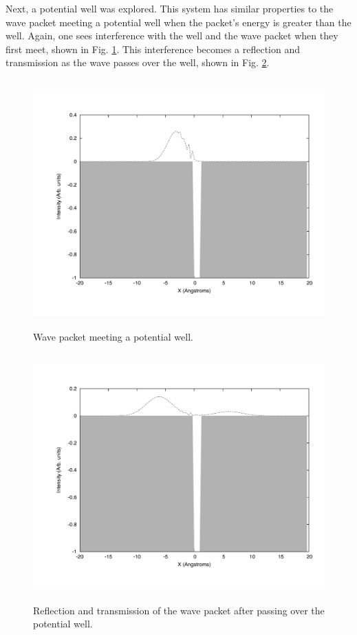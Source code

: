 \documentclass[12pt]{article}
\begin{document}
Next, a potential well was explored.  This system has similar properties to the wave packet meeting a potential well when the packet's energy is greater than the well.  Again, one sees interference with the well and the wave packet when they first meet, shown in Fig. \ref{fig:726c}.  This interference becomes a reflection and transmission as the wave passes over the well, shown in Fig. \ref{fig:726r}.

\begin{figure}[!h]
\centering
\includegraphics[width =120 mm, height = 95mm]{Ex_7_26_collis.pdf}
\caption{Wave packet meeting a potential well.}
\label{fig:726c}
\end{figure}
\begin{figure}[!h]
\centering
\includegraphics[width =120 mm, height = 95mm]{Ex_7_26_reflec.pdf}
\caption{Reflection and transmission of the wave packet after passing over the potential well.}
\label{fig:726r}
\end{figure}
\end{document}
